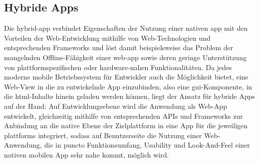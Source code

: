 \subsection{Hybride Apps} \label{sec:hybrid-app}

Die \gls{hybrid-app} verbindet Eigenschaften der Nutzung einer nativen \gls{app} mit den Vorteilen der Web-Entwicklung mithilfe von Web-Technologien und entsprechenden Frameworks und löst damit beispielsweise das Problem der mangelnden Offline-Fähigkeit einer \gls{web-app} sowie deren geringe Unterstützung von plattformspezifischen oder hardware-nahen Funktionalitäten. 
Da jedes moderne mobile Betriebssystem für Entwickler auch die Möglichkeit bietet, eine Web-View in die zu entwickelnde App einzubinden, also eine \gls{gui}-Komponente, in die \gls{html}-Inhalte hinein geladen werden können, liegt der Ansatz für hybride Apps auf der Hand: Auf Entwicklungsebene wird die Anwendung als Web-App entwickelt, gleichzeitig mithilfe von entsprechenden APIs und Frameworks zur Anbindung an die native Ebene der Zielplattform in eine App für die jeweiligen \glspl{plattform} integriert, sodass auf Benutzerseite die Nutzung einer Web-Anwendung, die in puncto Funktionsumfang, Usability und Look-And-Feel einer nativen mobilen App sehr nahe kommt, möglich wird.

